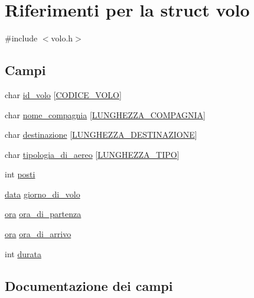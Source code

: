 \hypertarget{structvolo}{}\section{Riferimenti per la struct volo}
\label{structvolo}


{\ttfamily \#include $<$volo.\+h$>$}

\subsection*{Campi}
\begin{DoxyCompactItemize}
\item 
char \hyperlink{structvolo_a625724f72992457d9a9f7f284c9f330e}{id\+\_\+volo} \mbox{[}\hyperlink{costanti_8h_a99ae2e7fbc7078b725a05249bd95f22c}{C\+O\+D\+I\+C\+E\+\_\+\+V\+O\+LO}\mbox{]}
\item 
char \hyperlink{structvolo_a01d7ba0155e69869b1ff2d768a924984}{nome\+\_\+compagnia} \mbox{[}\hyperlink{costanti_8h_a515b7beeda2306d90ac73a4dfa727097}{L\+U\+N\+G\+H\+E\+Z\+Z\+A\+\_\+\+C\+O\+M\+P\+A\+G\+N\+IA}\mbox{]}
\item 
char \hyperlink{structvolo_a8fa9e231cba10d96d4bea0fd57198a7e}{destinazione} \mbox{[}\hyperlink{costanti_8h_ad2da2314fee54750f005c72b82d9310a}{L\+U\+N\+G\+H\+E\+Z\+Z\+A\+\_\+\+D\+E\+S\+T\+I\+N\+A\+Z\+I\+O\+NE}\mbox{]}
\item 
char \hyperlink{structvolo_aec6b08e749eba6c59301c1cd54f426d0}{tipologia\+\_\+di\+\_\+aereo} \mbox{[}\hyperlink{costanti_8h_ada66e83c0e4395daca534ca22a09cede}{L\+U\+N\+G\+H\+E\+Z\+Z\+A\+\_\+\+T\+I\+PO}\mbox{]}
\item 
int \hyperlink{structvolo_a6c1db522301f7f750eedbf4455882030}{posti}
\item 
\hyperlink{structdata}{data} \hyperlink{structvolo_a8017cfc4e25b927088a5ab4c61f2793b}{giorno\+\_\+di\+\_\+volo}
\item 
\hyperlink{structora}{ora} \hyperlink{structvolo_a62eb1286c091b4b3cb45ac12f617f847}{ora\+\_\+di\+\_\+partenza}
\item 
\hyperlink{structora}{ora} \hyperlink{structvolo_a013796dd7b5b4846ca0dab42dbee42af}{ora\+\_\+di\+\_\+arrivo}
\item 
int \hyperlink{structvolo_a0b5ad7cb2a2aee4335c043b085a320c8}{durata}
\end{DoxyCompactItemize}


\subsection{Documentazione dei campi}
\mbox{\label{structvolo_a8fa9e231cba10d96d4bea0fd57198a7e}} 
